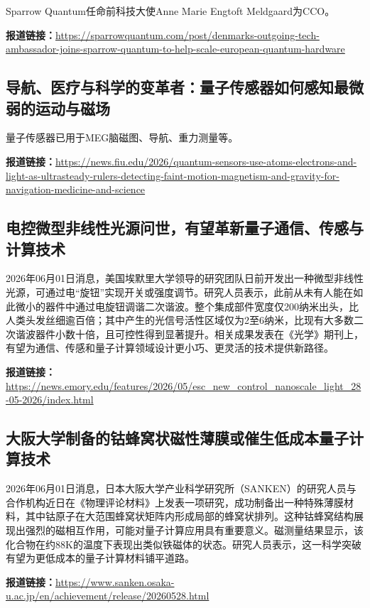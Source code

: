 \documentclass[12pt,a4paper]{ctexart}
\begin{document}
Sparrow Quantum任命前科技大使Anne Marie Engtoft Meldgaard为CCO。

\noindent\textbf{报道链接：}\url{https://sparrowquantum.com/post/denmarks-outgoing-tech-ambassador-joins-sparrow-quantum-to-help-scale-european-quantum-hardware}

\subsection{ 导航、医疗与科学的变革者：量子传感器如何感知最微弱的运动与磁场 }

量子传感器已用于MEG脑磁图、导航、重力测量等。

\noindent\textbf{报道链接：}\url{https://news.fiu.edu/2026/quantum-sensors-use-atoms-electrons-and-light-as-ultrasteady-rulers-detecting-faint-motion-magnetism-and-gravity-for-navigation-medicine-and-science}

\subsection{ 电控微型非线性光源问世，有望革新量子通信、传感与计算技术 }

2026年06月01日消息，美国埃默里大学领导的研究团队日前开发出一种微型非线性光源，可通过电“旋钮”实现开关或强度调节。研究人员表示，此前从未有人能在如此微小的器件中通过电旋钮调谐二次谐波。整个集成部件宽度仅200纳米出头，比人类头发丝细逾百倍；其中产生的光信号活性区域仅为2至6纳米，比现有大多数二次谐波器件小数十倍，且可控性得到显著提升。相关成果发表在《光学》期刊上，有望为通信、传感和量子计算领域设计更小巧、更灵活的技术提供新路径。

\noindent\textbf{报道链接：}\url{https://news.emory.edu/features/2026/05/esc\_new\_control\_nanoscale\_light\_28-05-2026/index.html}

\subsection{ 大阪大学制备的钴蜂窝状磁性薄膜或催生低成本量子计算技术 }

2026年06月01日消息，日本大阪大学产业科学研究所（SANKEN）的研究人员与合作机构近日在《物理评论材料》上发表一项研究，成功制备出一种特殊薄膜材料，其中钴原子在大范围蜂窝状矩阵内形成局部的蜂窝状排列。这种钴蜂窝结构展现出强烈的磁相互作用，可能对量子计算应用具有重要意义。磁测量结果显示，该化合物在约88K的温度下表现出类似铁磁体的状态。研究人员表示，这一科学突破有望为更低成本的量子计算材料铺平道路。

\noindent\textbf{报道链接：}\url{https://www.sanken.osaka-u.ac.jp/en/achievement/release/20260528.html}
\end{document}

